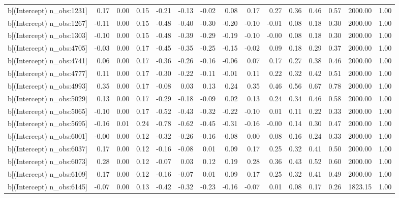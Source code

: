 \begin{table}[ht]
\begin{tabular}{rrrrrrrrrrrrrrr}
  b[(Intercept) n\_obs:1231] & 0.17 & 0.00 & 0.15 & -0.21 & -0.13 & -0.02 & 0.08 & 0.17 & 0.27 & 0.36 & 0.46 & 0.57 & 2000.00 & 1.00 \\ 
  b[(Intercept) n\_obs:1267] & -0.11 & 0.00 & 0.15 & -0.48 & -0.40 & -0.30 & -0.20 & -0.10 & -0.01 & 0.08 & 0.18 & 0.30 & 2000.00 & 1.00 \\ 
  b[(Intercept) n\_obs:1303] & -0.10 & 0.00 & 0.15 & -0.48 & -0.39 & -0.29 & -0.19 & -0.10 & -0.00 & 0.08 & 0.18 & 0.30 & 2000.00 & 1.00 \\ 
  b[(Intercept) n\_obs:4705] & -0.03 & 0.00 & 0.17 & -0.45 & -0.35 & -0.25 & -0.15 & -0.02 & 0.09 & 0.18 & 0.29 & 0.37 & 2000.00 & 1.00 \\ 
  b[(Intercept) n\_obs:4741] & 0.06 & 0.00 & 0.17 & -0.36 & -0.26 & -0.16 & -0.06 & 0.07 & 0.17 & 0.27 & 0.38 & 0.46 & 2000.00 & 1.00 \\ 
  b[(Intercept) n\_obs:4777] & 0.11 & 0.00 & 0.17 & -0.30 & -0.22 & -0.11 & -0.01 & 0.11 & 0.22 & 0.32 & 0.42 & 0.51 & 2000.00 & 1.00 \\ 
  b[(Intercept) n\_obs:4993] & 0.35 & 0.00 & 0.17 & -0.08 & 0.03 & 0.13 & 0.24 & 0.35 & 0.46 & 0.56 & 0.67 & 0.78 & 2000.00 & 1.00 \\ 
  b[(Intercept) n\_obs:5029] & 0.13 & 0.00 & 0.17 & -0.29 & -0.18 & -0.09 & 0.02 & 0.13 & 0.24 & 0.34 & 0.46 & 0.58 & 2000.00 & 1.00 \\ 
  b[(Intercept) n\_obs:5065] & -0.10 & 0.00 & 0.17 & -0.52 & -0.43 & -0.32 & -0.22 & -0.10 & 0.01 & 0.11 & 0.22 & 0.33 & 2000.00 & 1.00 \\ 
  b[(Intercept) n\_obs:5695] & -0.16 & 0.01 & 0.24 & -0.78 & -0.62 & -0.45 & -0.31 & -0.16 & -0.00 & 0.14 & 0.30 & 0.47 & 2000.00 & 1.00 \\ 
  b[(Intercept) n\_obs:6001] & -0.00 & 0.00 & 0.12 & -0.32 & -0.26 & -0.16 & -0.08 & 0.00 & 0.08 & 0.16 & 0.24 & 0.33 & 2000.00 & 1.00 \\ 
  b[(Intercept) n\_obs:6037] & 0.17 & 0.00 & 0.12 & -0.16 & -0.08 & 0.01 & 0.09 & 0.17 & 0.25 & 0.32 & 0.41 & 0.50 & 2000.00 & 1.00 \\ 
  b[(Intercept) n\_obs:6073] & 0.28 & 0.00 & 0.12 & -0.07 & 0.03 & 0.12 & 0.19 & 0.28 & 0.36 & 0.43 & 0.52 & 0.60 & 2000.00 & 1.00 \\ 
  b[(Intercept) n\_obs:6109] & 0.17 & 0.00 & 0.12 & -0.16 & -0.07 & 0.01 & 0.09 & 0.17 & 0.25 & 0.32 & 0.41 & 0.49 & 2000.00 & 1.00 \\ 
  b[(Intercept) n\_obs:6145] & -0.07 & 0.00 & 0.13 & -0.42 & -0.32 & -0.23 & -0.16 & -0.07 & 0.01 & 0.08 & 0.17 & 0.26 & 1823.15 & 1.00 \\ 

\end{tabular}
\end{table}
